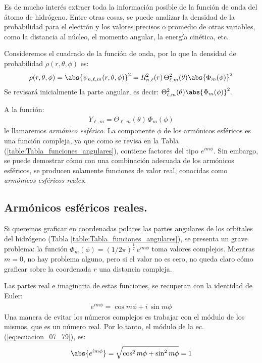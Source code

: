 Es de mucho interés extraer toda la información posible de la función de onda del átomo de hidrógeno. Entre otras cosas, se puede analizar la densidad de la probabilidad para el electrón y los valores precisos o promedio de otras variables, como la distancia al núcleo, el momento angular, la energía cinética, etc.
\par
Consideremos el cuadrado de la función de onda, por lo que la densidad de probabilidad $\rho (r, \theta, \phi)$ es:
\begin{align}
\rho (r, \theta, \phi) = \abs{\psi_{n, \ell, m} (r, \theta, \phi)}^{2} = R_{n,\ell}^{2} (r) \, \Theta_{\ell,m}^{2} (\theta) \abs{\Phi_{m} (\phi)}^{2}
\label{eq:ecuacion_07_42}
\end{align}
Se revisará inicialmente la parte angular, es decir: $\Theta_{\ell,m}^{2} (\theta) \abs{\Phi_{m} (\phi)}^{2}$.
\par
A la función:
\begin{align}
Y_{\ell, m} = \Theta_{\ell,m} (\theta) \,\Phi_{m} (\phi)
\label{eq:ecuacion_07_76}
\end{align}
le llamaremos \emph{armónico esférico}. La componente $\phi$ de los armónicos esféricos es una función compleja, ya que como se revisa en la Tabla (\ref{table:Tabla_funciones_angulares}), contiene factores del tipo $e^{i m \phi}$. Sin embargo, se puede demostrar cómo con una combinación adecuada de los armónicos esféricos, se producen solamente funciones de valor real, conocidas como \emph{armónicos esféricos reales}.

\subsection{Armónicos esféricos reales.}

Si queremos graficar en coordenadas polares las partes angulares de los orbitales del hidrógeno (Tabla \ref{table:Tabla_funciones_angulares}), se presenta un grave problema: la función $\Phi_{m} (\phi) = (1/2 \pi)^{\frac{1}{2}} \, e^{i m \phi}$ toma valores complejos. Mientras $m = 0$, no hay problema alguno, pero si el valor no es cero, no queda claro cómo graficar sobre la coordenada $r$ una distancia compleja.
\par
Las partes real e imaginaria de estas funciones, se recuperan con la identidad de Euler:
\begin{align}
e^{i m \phi} = \cos m \phi + i \, \sin m \phi
\label{eq:ecuacion_07_79}
\end{align}
Una manera de evitar los números complejos es trabajar con el módulo de los mismos, que es un número real. Por lo tanto, el módulo de la ec. (\ref{eq:ecuacion_07_79}), es:
\begin{align}
\abs{e^{i m \phi}} = \sqrt{ \cos^{2} m \phi + \sin^{2} m \phi} = 1
\label{eq:ecuacion_07_80}
\end{align}

